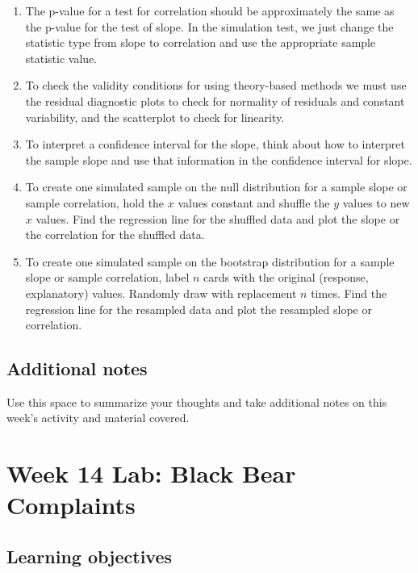 \documentclass[
]{report}
\begin{document}
\begin{enumerate}
\def\labelenumi{\arabic{enumi}.}
\item
  The p-value for a test for correlation should be approximately the same as the p-value for the test of slope. In the simulation test, we just change the statistic type from slope to correlation and use the appropriate sample statistic value.
\item
  To check the validity conditions for using theory-based methods we must use the residual diagnostic plots to check for normality of residuals and constant variability, and the scatterplot to check for linearity.
\item
  To interpret a confidence interval for the slope, think about how to interpret the sample slope and use that information in the confidence interval for slope.
\item
  To create one simulated sample on the null distribution for a sample slope or sample correlation, hold the \(x\) values constant and shuffle the \(y\) values to new \(x\) values. Find the regression line for the shuffled data and plot the slope or the correlation for the shuffled data.
\item
  To create one simulated sample on the bootstrap distribution for a sample slope or sample correlation, label \(n\) cards with the original (response, explanatory) values. Randomly draw with replacement \(n\) times. Find the regression line for the resampled data and plot the resampled slope or correlation.
\end{enumerate}

\hypertarget{additional-notes-23}{%
\subsection{Additional notes}\label{additional-notes-23}}

Use this space to summarize your thoughts and take additional notes on this week's activity and material covered.

\newpage

\hypertarget{week-14-lab-black-bear-complaints}{%
\section{Week 14 Lab: Black Bear Complaints}\label{week-14-lab-black-bear-complaints}}


\hypertarget{learning-objectives-22}{%
\subsection{Learning objectives}\label{learning-objectives-22}}
\end{document}
